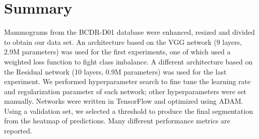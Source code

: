 \section{Summary}
Mammograms from the BCDR-D01 database were enhanced, resized and divided to obtain our data set. An architecture based on the VGG network (9 layers, 2.9M parameters) was used for the first experiments, one of which used a weighted loss function to fight class imbalance. A different architecture based on the Residual network (10 layers, 0.9M parameters) was used for the last experiment. We performed hyperparameter search to fine tune the learning rate and regularization parameter of each network; other hyperparameters were set manually. Networks were written in TensorFlow and optimized using ADAM. Using a validation set, we selected a threshold to produce the final segmentation from the heatmap of predictions. Many different performance metrics are reported.
